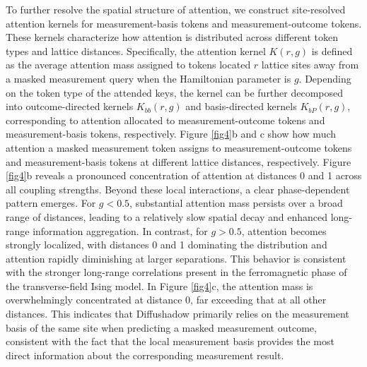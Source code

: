 \documentclass[pdflatex,sn-mathphys-num]{sn-jnl}%
\theoremstyle{thmstyleone}%
\theoremstyle{thmstyletwo}%
\theoremstyle{thmstylethree}%
\begin{document}
 
To further resolve the spatial structure of attention, we construct site-resolved attention kernels for measurement-basis tokens and measurement-outcome tokens. These kernels characterize how attention is distributed across different token types and lattice distances.
Specifically, the attention kernel $K(r, g)$ is defined as the average attention mass assigned to tokens located $r$ lattice sites away from a masked measurement query when the Hamiltonian parameter is $g$. 
Depending on the token type of the attended keys, the kernel can be further decomposed into outcome-directed kernels $K_{bb}(r, g)$ and basis-directed kernels $K_{bP}(r, g)$, corresponding to attention allocated to measurement-outcome tokens and measurement-basis tokens, respectively. Figure \ref{fig4}b and c show how much attention a masked measurement token assigns to measurement-outcome tokens and measurement-basis tokens at different lattice distances, respectively.
Figure \ref{fig4}b reveals a pronounced concentration of attention at distances 0 and 1 across all coupling strengths. Beyond these local interactions, a clear phase-dependent pattern emerges. For $g<0.5$, substantial attention mass persists over a broad range of distances, leading to a relatively slow spatial decay and enhanced long-range information aggregation. In contrast, for $g>0.5$, attention becomes strongly localized, with distances 0 and 1 dominating the distribution and attention rapidly diminishing at larger separations. This behavior is consistent with the stronger long-range correlations present in the ferromagnetic phase of the transverse-field Ising model.
In Figure \ref{fig4}c, the attention mass is overwhelmingly concentrated at distance 0, far exceeding that at all other distances. This indicates that Diffushadow primarily relies on the measurement basis of the same site when predicting a masked measurement outcome, consistent with the fact that the local measurement basis provides the most direct information about the corresponding measurement result.


\end{document}
